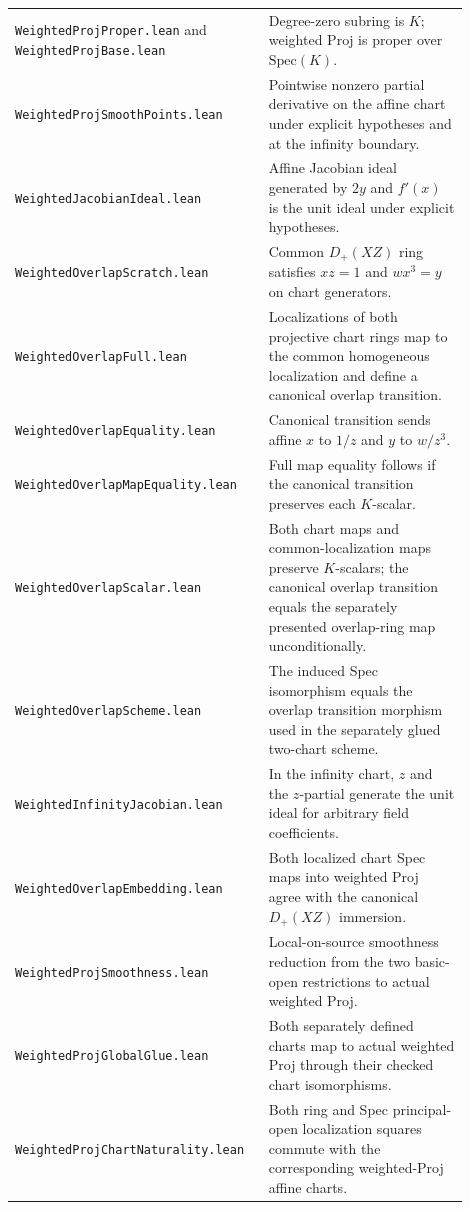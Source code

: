 \documentclass[10pt]{article}
\begin{document}
\begin{longtable}{p{0.48\linewidth}p{0.42\linewidth}}
\texttt{WeightedProjProper.lean} and \texttt{WeightedProjBase.lean} & Degree-zero subring is $K$; weighted $\mathrm{Proj}$ is proper over $\mathrm{Spec}(K)$.\\
\texttt{WeightedProjSmoothPoints.lean} & Pointwise nonzero partial derivative on the affine chart under explicit hypotheses and at the infinity boundary.\\
\texttt{WeightedJacobianIdeal.lean} & Affine Jacobian ideal generated by $2y$ and $f' (x)$ is the unit ideal under explicit hypotheses.\\
\texttt{WeightedOverlapScratch.lean} & Common $D_+(XZ)$ ring satisfies $xz=1$ and $wx^3=y$ on chart generators.\\
\texttt{WeightedOverlapFull.lean} & Localizations of both projective chart rings map to the common homogeneous localization and define a canonical overlap transition.\\
\texttt{WeightedOverlapEquality.lean} & Canonical transition sends affine $x$ to $1/z$ and $y$ to $w/z^3$.\\
\texttt{WeightedOverlapMapEquality.lean} & Full map equality follows if the canonical transition preserves each $K$-scalar.\\
\texttt{WeightedOverlapScalar.lean} & Both chart maps and common-localization maps preserve $K$-scalars; the canonical overlap transition equals the separately presented overlap-ring map unconditionally.\\
\texttt{WeightedOverlapScheme.lean} & The induced Spec isomorphism equals the overlap transition morphism used in the separately glued two-chart scheme.\\
\texttt{WeightedInfinityJacobian.lean} & In the infinity chart, $z$ and the $z$-partial generate the unit ideal for arbitrary field coefficients.\\
\texttt{WeightedOverlapEmbedding.lean} & Both localized chart Spec maps into weighted Proj agree with the canonical $D_+(XZ)$ immersion.\\
\texttt{WeightedProjSmoothness.lean} & Local-on-source smoothness reduction from the two basic-open restrictions to actual weighted Proj.\\
\texttt{WeightedProjGlobalGlue.lean} & Both separately defined charts map to actual weighted Proj through their checked chart isomorphisms.\\
\texttt{WeightedProjChartNaturality.lean} & Both ring and Spec principal-open localization squares commute with the corresponding weighted-Proj affine charts.\\

\end{longtable}
\end{document}
